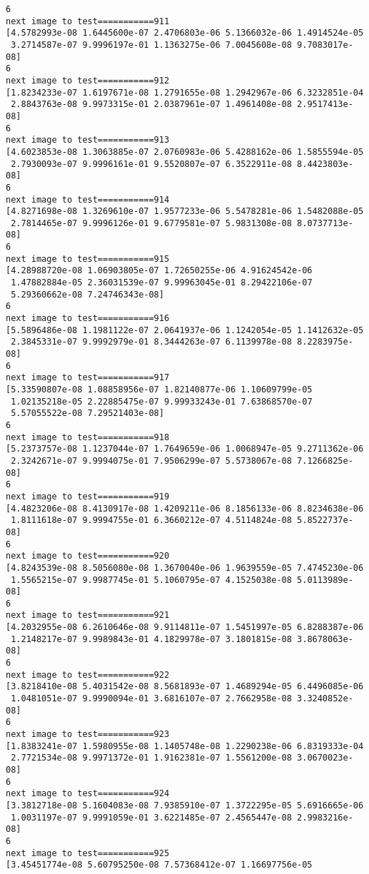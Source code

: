 \documentclass[11pt]{article}
\begin{document}
\begin{Verbatim}[commandchars=\\\{\}]
6
next image to test===========911
[4.5782993e-08 1.6445600e-07 2.4706803e-06 5.1366032e-06 1.4914524e-05
 3.2714587e-07 9.9996197e-01 1.1363275e-06 7.0045608e-08 9.7083017e-08]
6
next image to test===========912
[1.8234233e-07 1.6197671e-08 1.2791655e-08 1.2942967e-06 6.3232851e-04
 2.8843763e-08 9.9973315e-01 2.0387961e-07 1.4961408e-08 2.9517413e-08]
6
next image to test===========913
[4.6023853e-08 1.3063885e-07 2.0760983e-06 5.4288162e-06 1.5855594e-05
 2.7930093e-07 9.9996161e-01 9.5520807e-07 6.3522911e-08 8.4423803e-08]
6
next image to test===========914
[4.8271698e-08 1.3269610e-07 1.9577233e-06 5.5478281e-06 1.5482088e-05
 2.7814465e-07 9.9996126e-01 9.6779581e-07 5.9831308e-08 8.0737713e-08]
6
next image to test===========915
[4.28988720e-08 1.06903805e-07 1.72650255e-06 4.91624542e-06
 1.47882884e-05 2.36031539e-07 9.99963045e-01 8.29422106e-07
 5.29360662e-08 7.24746343e-08]
6
next image to test===========916
[5.5896486e-08 1.1981122e-07 2.0641937e-06 1.1242054e-05 1.1412632e-05
 2.3845331e-07 9.9992979e-01 8.3444263e-07 6.1139978e-08 8.2283975e-08]
6
next image to test===========917
[5.33590807e-08 1.08858956e-07 1.82140877e-06 1.10609799e-05
 1.02135218e-05 2.22885475e-07 9.99933243e-01 7.63868570e-07
 5.57055522e-08 7.29521403e-08]
6
next image to test===========918
[5.2373757e-08 1.1237044e-07 1.7649659e-06 1.0068947e-05 9.2711362e-06
 2.3242671e-07 9.9994075e-01 7.9506299e-07 5.5738067e-08 7.1266825e-08]
6
next image to test===========919
[4.4823206e-08 8.4130917e-08 1.4209211e-06 8.1856133e-06 8.8234638e-06
 1.8111618e-07 9.9994755e-01 6.3660212e-07 4.5114824e-08 5.8522737e-08]
6
next image to test===========920
[4.8243539e-08 8.5056080e-08 1.3670040e-06 1.9639559e-05 7.4745230e-06
 1.5565215e-07 9.9987745e-01 5.1060795e-07 4.1525038e-08 5.0113989e-08]
6
next image to test===========921
[4.2032955e-08 6.2610646e-08 9.9114811e-07 1.5451997e-05 6.8288387e-06
 1.2148217e-07 9.9989843e-01 4.1829978e-07 3.1801815e-08 3.8678063e-08]
6
next image to test===========922
[3.8218410e-08 5.4031542e-08 8.5681893e-07 1.4689294e-05 6.4496085e-06
 1.0481051e-07 9.9990094e-01 3.6816107e-07 2.7662958e-08 3.3240852e-08]
6
next image to test===========923
[1.8383241e-07 1.5980955e-08 1.1405748e-08 1.2290238e-06 6.8319333e-04
 2.7721534e-08 9.9971372e-01 1.9162381e-07 1.5561200e-08 3.0670023e-08]
6
next image to test===========924
[3.3812718e-08 5.1604083e-08 7.9385910e-07 1.3722295e-05 5.6916665e-06
 1.0031197e-07 9.9991059e-01 3.6221485e-07 2.4565447e-08 2.9983216e-08]
6
next image to test===========925
[3.45451774e-08 5.60795250e-08 7.57368412e-07 1.16697756e-05

\end{Verbatim}
\end{document}
